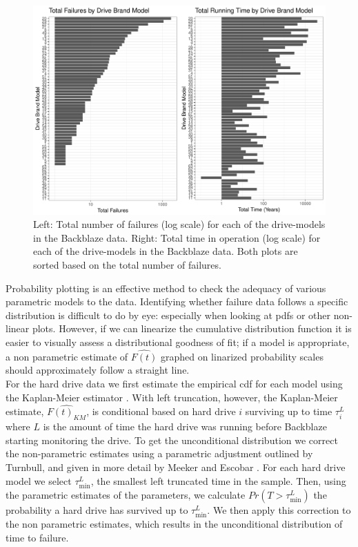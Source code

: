 \documentclass[12pt]{article}
\begin{document}
\begin{figure}[H]
\includegraphics[width=\textwidth]{fig/data_sum.pdf}
\caption{Left: Total number of failures (log scale) for each of the drive-models in the Backblaze data. Right: Total time in operation (log scale) for each of the drive-models in the Backblaze data.  Both plots are sorted based on the total number of failures.}
\label{fig2}
\end{figure}


Probability plotting is an effective method to check the adequacy of various parametric models to the data.  Identifying whether failure data follows a specific distribution is difficult to do by eye: especially when looking at pdfs or other non-linear plots.  However, if we can linearize the cumulative distribution function it is easier to visually assess a distributional goodness of fit; if a model is appropriate, a non parametric estimate of $\hat{F(t)}$ graphed on linarized probability scales should approximately follow a straight line. \\

For the hard drive data we first estimate the empirical cdf for each model using the Kaplan-Meier estimator \cite{kaplan}.  With left truncation, however, the Kaplan-Meier estimate, $\widehat{F(t)_{KM}}$, is conditional based on hard drive $i$ surviving up to time $\tau_i^L$ where $L$ is the amount of time the hard drive was running before Backblaze starting monitoring the drive.  To get the unconditional distribution we correct the non-parametric estimates using a parametric adjustment outlined by Turnbull, and given in more detail by Meeker and Escobar \cite{turnbull,meeker}.  For each hard drive model we select $\tau_{\text{min}}^L$, the smallest left truncated time in the sample.  Then, using the parametric estimates of the parameters, we calculate $Pr(T>\tau_\text{min}^L)$ the probability a hard drive has survived up to $\tau_{\text{min}}^L$.  We then apply this correction to the non parametric estimates, which results in the unconditional distribution of time to failure.\\
\end{document}

